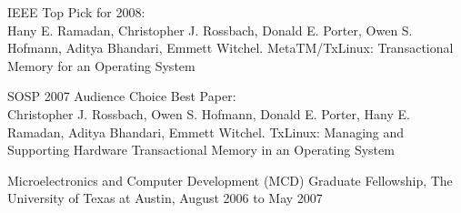 \documentclass[10pt]{article}
\begin{document}
\bigskip

IEEE Top Pick for 2008: \\
Hany E. Ramadan, Christopher J. Rossbach, Donald E. Porter,
Owen S. Hofmann, Aditya Bhandari, Emmett Witchel.
MetaTM/TxLinux: Transactional Memory for an Operating System

\bigskip

SOSP 2007 Audience Choice Best Paper: \\
Christopher J. Rossbach,
Owen S. Hofmann, Donald E. Porter, Hany E. Ramadan, Aditya Bhandari,
Emmett Witchel. 
TxLinux: Managing and Supporting Hardware Transactional Memory in an
Operating
System

\bigskip

Microelectronics and Computer Development (MCD) Graduate Fellowship,
The University of Texas at Austin, August 2006 to May 2007

\pagebreak
\end{document}
